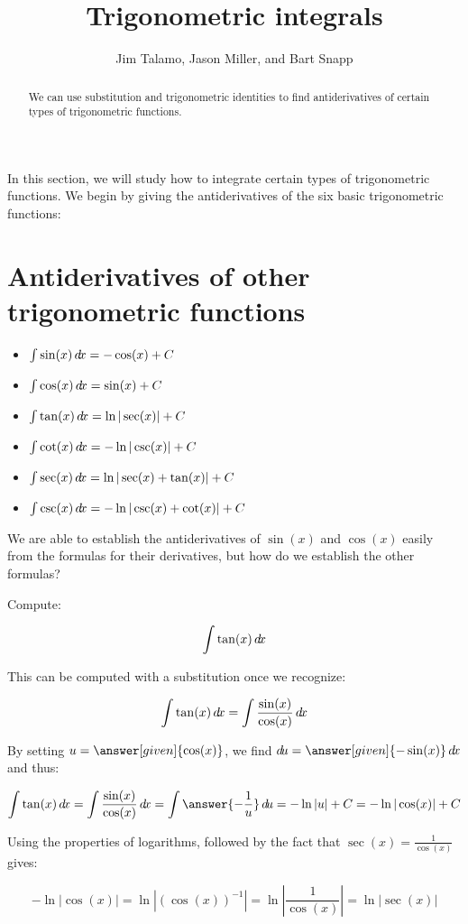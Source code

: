 \documentclass{ximera}
\author{Jim Talamo, Jason Miller, and Bart Snapp}
\title[Dig-In:]{Trigonometric integrals}
\begin{document}
\begin{abstract}
  We can use substitution and trigonometric identities to find antiderivatives of certain types of
  trigonometric functions.
\end{abstract}
\maketitle

In this section, we will study how to integrate certain types of trigonometric functions.  We begin by giving the antiderivatives of the six basic trigonometric functions:


\section{Antiderivatives of other trigonometric functions}

\begin{theorem}\hfil
  \begin{itemize}
  \item $\int \sin(x) \mathop{}\!d\! x = - \cos(x)+C$
  \item $\int \cos(x) \mathop{}\!d\! x = \sin(x)+C$
  \item $\int \tan(x) \mathop{}\!d\! x = \ln|\sec(x)| + C$
  \item $\int \cot(x) \mathop{}\!d\! x = -\ln|\csc(x)| + C$
  \item $\int \sec(x) \mathop{}\!d\! x = \ln|\sec(x) + \tan(x)| + C$
  \item $\int \csc(x) \mathop{}\!d\! x = -\ln|\csc(x) + \cot(x)| + C$
  \end{itemize}
\end{theorem}

We are able to establish the antiderivatives of $\sin(x)$ and $\cos(x)$ easily from the formulas for their derivatives, but how do we establish the other formulas?  

\begin{example}
Compute:

\[
\int \tan(x) \mathop{}\!d\! x
\]

This can be computed with a substitution once we recognize:

\[
\int \tan(x) \mathop{}\!d\! x = \int \frac{\sin(x)}{\cos(x)} \mathop{}\!d\! x
\]

By setting $u = \answer[given]{\cos(x)}$, we find $\d u = \answer[given]{-\sin(x)} \d x$ and thus:

\[
\int \tan(x) \d x = \int \frac{\sin(x)}{\cos(x)} \d x =\int \answer{-  \frac{1}{u}} \d u =-\ln|u|+C = -\ln|\cos(x)|+C
\]

Using the properties of logarithms, followed by the fact that $\sec(x) = \frac{1}{\cos(x)}$ gives:

\[
-\ln|\cos(x)| = \ln \left| (\cos(x))^{-1} \right| = \ln \left| \frac{1}{\cos(x)} \right| = \ln|\sec(x)|
\]


\end{example}
 
\end{document}

